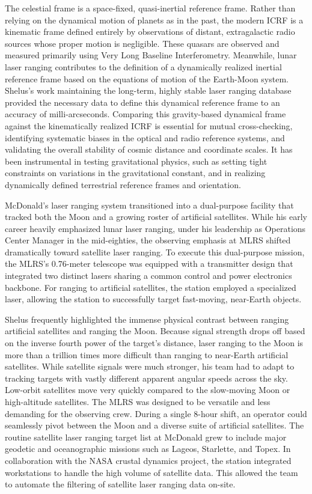 The celestial frame is a space-fixed, quasi-inertial reference frame. Rather than relying on the dynamical motion of planets as in the past, the modern ICRF is a kinematic frame defined entirely by observations of distant, extragalactic radio sources whose proper motion is negligible. These quasars are observed and measured primarily using Very Long Baseline Interferometry. Meanwhile, lunar laser ranging contributes to the definition of a dynamically realized inertial reference frame based on the equations of motion of the Earth-Moon system. Shelus’s work maintaining the long-term, highly stable laser ranging database provided the necessary data to define this dynamical reference frame to an accuracy of milli-arcseconds. Comparing this gravity-based dynamical frame against the kinematically realized ICRF is essential for mutual cross-checking, identifying systematic biases in the optical and radio reference systems, and validating the overall stability of cosmic distance and coordinate scales. It has been instrumental in testing gravitational physics, such as setting tight constraints on variations in the gravitational constant, and in realizing dynamically defined terrestrial reference frames and orientation.

McDonald’s laser ranging system transitioned into a dual-purpose facility that tracked both the Moon and a growing roster of artificial satellites. While his early career heavily emphasized lunar laser ranging, under his leadership as Operations Center Manager in the mid-eighties, the observing emphasis at MLRS shifted dramatically toward satellite laser ranging. To execute this dual-purpose mission, the MLRS's 0.76-meter telescope was equipped with a transmitter design that integrated two distinct lasers sharing a common control and power electronics backbone. For ranging to artificial satellites, the station employed a specialized laser, allowing the station to successfully target fast-moving, near-Earth objects.

Shelus frequently highlighted the immense physical contrast between ranging artificial satellites and ranging the Moon. Because signal strength drops off based on the inverse fourth power of the target's distance, laser ranging to the Moon is more than a trillion times more difficult than ranging to near-Earth artificial satellites. While satellite signals were much stronger, his team had to adapt to tracking targets with vastly different apparent angular speeds across the sky. Low-orbit satellites move very quickly compared to the slow-moving Moon or high-altitude satellites. The MLRS was designed to be versatile and less demanding for the observing crew. During a single 8-hour shift, an operator could seamlessly pivot between the Moon and a diverse suite of artificial satellites. The routine satellite laser ranging target list at McDonald grew to include major geodetic and oceanographic missions such as Lageos, Starlette, and Topex. In collaboration with the NASA crustal dynamics project, the station integrated workstations to handle the high volume of satellite data. This allowed the team to automate the filtering of satellite laser ranging data on-site.

